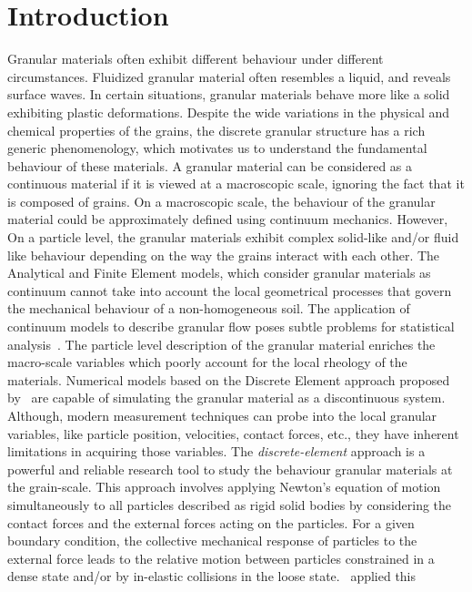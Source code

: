 \section{Introduction}
Granular materials often exhibit different behaviour under different 
circumstances. Fluidized 
granular material often resembles a liquid, and reveals surface waves. In 
certain situations, 
granular materials behave more like a solid exhibiting plastic deformations. 
Despite the wide 
variations in the physical and chemical properties of the grains, the discrete 
granular structure 
has a rich generic phenomenology, which motivates us to understand the 
fundamental behaviour of 
these materials. A granular material can be considered as a continuous material 
if it is viewed at 
a macroscopic scale, ignoring the fact that it is composed of grains. On a 
macroscopic scale, the 
behaviour of the granular material could be approximately defined using 
continuum mechanics. 
However, On a particle level, the granular materials exhibit complex solid-like 
and/or fluid like 
behaviour depending on the way the grains interact with each other. The 
Analytical and Finite 
Element models, which consider granular materials as continuum cannot take into 
account the local 
geometrical processes that govern the mechanical behaviour of a non-homogeneous 
soil. The 
application of continuum models to describe granular flow poses subtle problems 
for statistical 
analysis~\citep{mehta1994}. The particle level description of the granular 
material enriches the 
macro-scale variables which poorly account for the local rheology of the 
materials. Numerical 
models based on the Discrete Element approach proposed by~\citet{Cundall1979} 
are capable of  
simulating the granular material as a discontinuous system. Although, modern 
measurement 
techniques 
can probe into the local granular variables, like particle position, 
velocities, contact forces, 
etc., they have inherent limitations in acquiring those variables. The 
\textit{discrete-element} 
approach is a powerful and reliable research tool to study the behaviour 
granular materials at the 
grain-scale. This approach involves applying Newton's equation of motion 
simultaneously to all 
particles described as rigid solid bodies by considering the contact forces and 
the external 
forces 
acting on the particles. For a given boundary condition, the collective 
mechanical response of 
particles to the external force leads to the relative motion between particles 
constrained in a 
dense state and/or by in-elastic collisions in the loose 
state.~\citet{Cundall1979} applied this 
